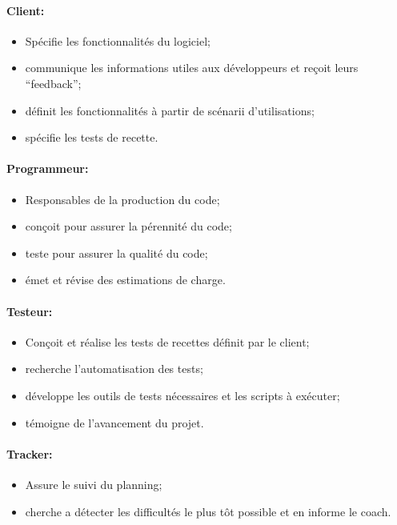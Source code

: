 \documentclass[a4paper,11pt,french]{article}
\begin{document}
\paragraph{Client:}
\begin{itemize}
 \item Spécifie les fonctionnalités du logiciel;
 \item communique les informations utiles aux développeurs et reçoit leurs 
``feedback'';
 \item définit les fonctionnalités à partir de scénarii d'utilisations;
 \item spécifie les tests de recette.
\end{itemize}

\paragraph{Programmeur:}
\begin{itemize}
 \item Responsables de la production du code;
 \item conçoit pour assurer la pérennité du code;
 \item teste pour assurer la qualité du code;
 \item émet et révise des estimations de charge.
\end{itemize}

\paragraph{Testeur:}
\begin{itemize}
 \item Conçoit et réalise les tests de recettes définit par le client;
 \item recherche l'automatisation des tests;
 \item développe les outils de tests nécessaires et les scripts à exécuter;
 \item témoigne de l'avancement du projet.
\end{itemize}

\paragraph{Tracker:}
\begin{itemize}
 \item Assure le suivi du planning;
 \item cherche a détecter les difficultés le plus tôt possible et en informe
le coach.
\end{itemize}
\end{document}

